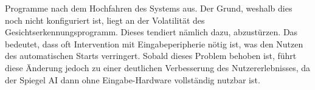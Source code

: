 Programme nach dem Hochfahren des Systems aus. Der Grund, weshalb dies noch nicht konfiguriert ist, liegt an der Volatilität des Gesichtserkennungsprogramm. Dieses tendiert nämlich dazu, abzustürzen. Das bedeutet, dass oft Intervention mit Eingabeperipherie nötig ist, was den Nutzen des automatischen Starts verringert. Sobald dieses Problem behoben ist, führt diese Änderung jedoch zu einer deutlichen Verbesserung des Nutzererlebnisses, da der Spiegel AI dann ohne Eingabe-Hardware vollständig nutzbar ist.